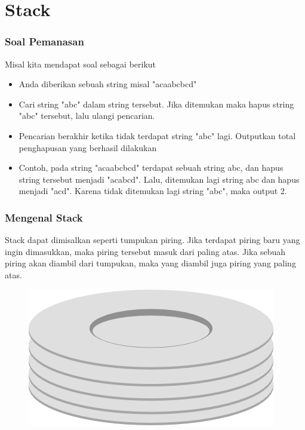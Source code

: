 \section{Stack}
\frame{\sectionpage}

\begin{frame}
\frametitle{Soal Pemanasan}

Misal kita mendapat soal sebagai berikut
\begin{itemize}
  \item Anda diberikan sebuah string misal "acaabcbcd"
  \item Cari string "abc" dalam string tersebut. Jika ditemukan maka hapus string "abc" tersebut, lalu ulangi pencarian.
  \item Pencarian berakhir ketika tidak terdapat string "abc" lagi. Outputkan total penghapusan yang berhasil dilakukan
  \item Contoh, pada string "acaabcbcd" terdapat sebuah string abc, dan hapus string tersebut menjadi "acabcd". Lalu, ditemukan lagi string abc dan hapus menjadi "acd". Karena tidak ditemukan lagi string "abc", maka output 2.
\end{itemize}
\end{frame}

\begin{frame}
\frametitle{Mengenal Stack}

Stack dapat dimisalkan seperti tumpukan piring. Jika terdapat piring baru yang ingin dimasukkan, maka piring tersebut masuk dari paling atas. Jika sebuah piring akan diambil dari tumpukan, maka yang diambil juga piring yang paling atas.

\begin{figure}
  \centering
  \includegraphics[width=4 cm]{asset/plates-stack.png}
\end{figure}

\end{frame}

